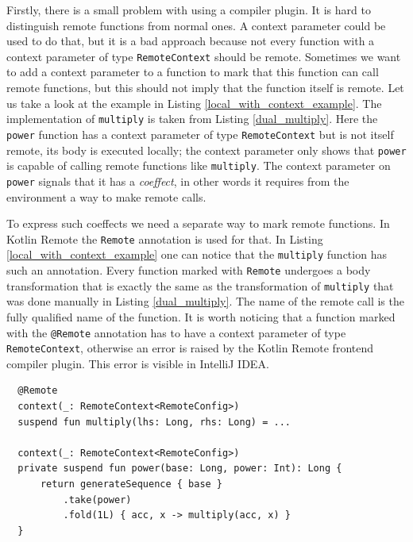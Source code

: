 \documentclass[a4paper,11pt,oneside]{article}
\newcommand{\term}[1]{\textit{#1}}
\newcommand{\kotlini}[1]{\texttt{#1}}
\begin{document}
Firstly, there is a small problem with using a compiler plugin. It is hard to distinguish remote functions
from normal ones. A context parameter could be used to do that, but it is a bad approach because not
every function with a context parameter of type \kotlini{RemoteContext} should be remote. Sometimes we want
to add a context parameter to a function to mark that this function can call remote functions, but this should not
imply that the function itself is remote. Let us take a look at the example in Listing
\ref{local_with_context_example}. The implementation of \kotlini{multiply} is taken from Listing \ref{dual_multiply}.
Here the \kotlini{power} function has a context parameter of type \kotlini{RemoteContext} but is not itself
remote, its body is executed locally; the context parameter only shows that \kotlini{power} is capable of
calling remote functions like \kotlini{multiply}. The context parameter on \kotlini{power}
signals that it has a \term{coeffect}, in other words it requires from the environment a way to make remote
calls.

To express such coeffects we need a separate way to mark remote functions. In Kotlin Remote the
\kotlini{Remote} annotation is used for that. In Listing \ref{local_with_context_example}
one can notice that the \kotlini{multiply} function has such an annotation. Every function marked with
\kotlini{Remote} undergoes a body transformation that is exactly the same as the transformation of
\kotlini{multiply} that was done manually in Listing \ref{dual_multiply}. The name of the
remote call is the fully qualified name of the function. It is worth noticing that a function marked with
the \kotlini{@Remote} annotation has to have a context parameter of type \kotlini{RemoteContext}, otherwise
an error is raised by the Kotlin Remote frontend compiler plugin. This error is visible in IntelliJ IDEA.

\begin{listing}[!h]
  \begin{verbatim}
  @Remote
  context(_: RemoteContext<RemoteConfig>)
  suspend fun multiply(lhs: Long, rhs: Long) = ...

  context(_: RemoteContext<RemoteConfig>)
  private suspend fun power(base: Long, power: Int): Long {
      return generateSequence { base }
          .take(power)
          .fold(1L) { acc, x -> multiply(acc, x) }
  }
  \end{verbatim}
  \caption{Local function with RemoteContext}\label{local_with_context_example}
\end{listing}
\end{document}
